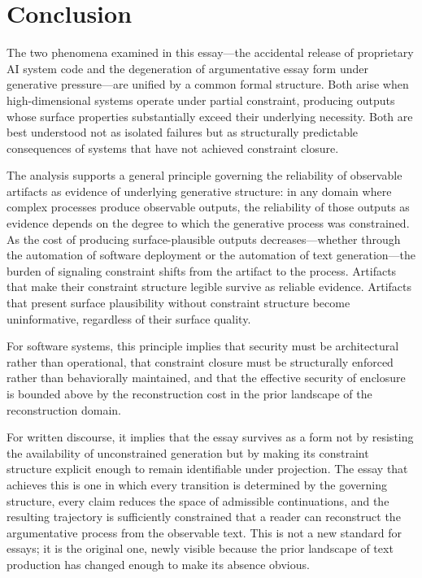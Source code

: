 \documentclass[12pt, oneside]{article}
\theoremstyle{plain}
\theoremstyle{definition}
\theoremstyle{remark}
\begin{document}
\section{Conclusion}

The two phenomena examined in this essay---the accidental release of proprietary AI system
code and the degeneration of argumentative essay form under generative pressure---are unified
by a common formal structure. Both arise when high-dimensional systems operate under partial
constraint, producing outputs whose surface properties substantially exceed their underlying
necessity. Both are best understood not as isolated failures but as structurally predictable
consequences of systems that have not achieved constraint closure.

The analysis supports a general principle governing the reliability of observable artifacts
as evidence of underlying generative structure: in any domain where complex processes
produce observable outputs, the reliability of those outputs as evidence depends on the
degree to which the generative process was constrained. As the cost of producing
surface-plausible outputs decreases---whether through the automation of software deployment
or the automation of text generation---the burden of signaling constraint shifts from the
artifact to the process. Artifacts that make their constraint structure legible survive as
reliable evidence. Artifacts that present surface plausibility without constraint structure
become uninformative, regardless of their surface quality.

For software systems, this principle implies that security must be architectural rather than
operational, that constraint closure must be structurally enforced rather than behaviorally
maintained, and that the effective security of enclosure is bounded above by the
reconstruction cost in the prior landscape of the reconstruction domain.

For written discourse, it implies that the essay survives as a form not by resisting the
availability of unconstrained generation but by making its constraint structure explicit
enough to remain identifiable under projection. The essay that achieves this is one in
which every transition is determined by the governing structure, every claim reduces the
space of admissible continuations, and the resulting trajectory is sufficiently constrained
that a reader can reconstruct the argumentative process from the observable text. This is
not a new standard for essays; it is the original one, newly visible because the prior
landscape of text production has changed enough to make its absence obvious.
\end{document}
